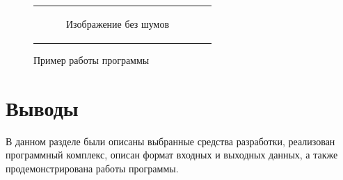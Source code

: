 \begin{figure}[h!]
\begin{tabular}{cc}
\begin{subfigure}{0.45\textwidth}
      \caption{Изображение без шумов}
    \end{subfigure} \\
  \end{tabular}
  \caption{Пример работы программы}
  \label{fig:demo}
\end{figure}

\newpage

\section{Выводы}

В данном разделе были описаны выбранные средства разработки, реализован программный комплекс, описан формат входных и выходных данных, а также продемонстрирована работы программы.